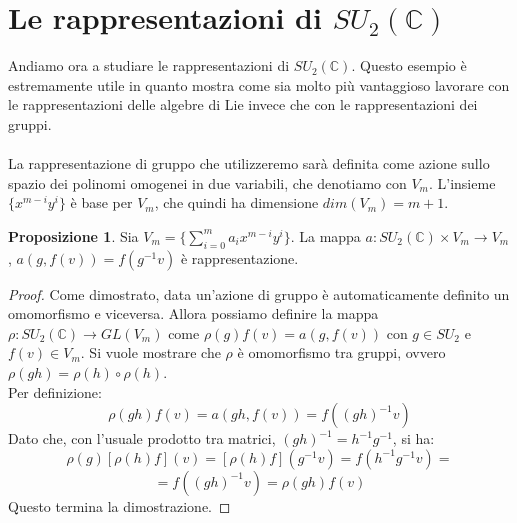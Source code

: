 \documentclass[12pt,a4paper]{report}
\theoremstyle{definition}
\theoremstyle{Theorem}
\newtheorem{Prop}[Def]{Proposizione}
\theoremstyle{definition}
\theoremstyle{definition}
\theoremstyle{definition}
\begin{document}
\section{Le rappresentazioni di $SU_2(\mathbb{C})$}
Andiamo ora a studiare le rappresentazioni di $SU_2(\mathbb{C})$. Questo esempio è estremamente utile in quanto mostra come sia molto più vantaggioso lavorare con le rappresentazioni delle algebre di Lie invece che con le rappresentazioni dei gruppi.\\
\\
La rappresentazione di gruppo che utilizzeremo sarà definita come azione sullo spazio dei polinomi omogenei in due variabili, che denotiamo con $V_m$.
	L'insieme $\{x^{m-i}y^i\}$ è base per $V_m$, che quindi ha dimensione $dim(V_m)=m+1$.
	\begin{comment}
		Sia $f(v)=f(x,y)$ un elemento di $V_m$ e $g$ un elemento di $SU_2(\mathbb{C})$ con inverso $g^{-1}$.\\
	Dunque, se $g\in SU_2(\mathbb{C})$ è nella forma $g=$
	$\begin{pmatrix}
	\alpha&\beta\\
	-\bar{\beta}&\bar{\alpha}
	\end{pmatrix}$,
	allora il suo inverso sarà $g^{-1}=
	\begin{pmatrix}
	\bar{\alpha}&-\beta\\
	\bar{\beta}&\alpha
	\end{pmatrix}$ dato che il determinante di $g$ è 1. \\
	Applicare $g^{-1}$ ad una coppia $(x,y)$ significa computare:
	$g^{-1}v=g^{-1}
	\begin{pmatrix}
	x\\y
	\end{pmatrix}=
	\begin{pmatrix}
	\bar{\alpha}x-\beta y\\
	\bar{\beta}x+\alpha y
	\end{pmatrix}$
	Da ciò $(g,f(x,y))\longmapsto f(\bar{\alpha}x-\beta y,\bar{\beta}x+\alpha y)$
	\end{comment}
\begin{Prop}
	Sia $V_m=\{\sum_{i=0}^{m} a_ix^{m-i}y^i\}$. La mappa $a:SU_2(\mathbb{C})\times V_m\rightarrow V_m$, $a(g,f(v))=f(g^{-1}v)$ è rappresentazione.
\end{Prop}
\begin{proof}
	Come dimostrato, data un'azione di gruppo è automaticamente definito un omomorfismo e viceversa. Allora possiamo definire la mappa $\rho:SU_2(\mathbb{C})\rightarrow GL(V_m)$ come $\rho(g)f(v)=a(g,f(v))$ con $g\in SU_2$ e $f(v)\in V_m$.
	Si vuole mostrare che $\rho$ è omomorfismo tra gruppi, ovvero $\rho(gh)=\rho(h)\circ\rho(h)$.\\
	Per definizione:
	$$\rho(gh)f(v)=a(gh,f(v))=f((gh)^{-1}v)$$
	Dato che, con l'usuale prodotto tra matrici, $(gh)^{-1}=h^{-1}g^{-1}$, si ha:
	$$\rho(g)[\rho(h)f](v)=[\rho(h)f](g^{-1}v)=f(h^{-1}g^{-1}v)=$$
	$$=f((gh)^{-1}v)=\rho(gh)f(v)$$
	Questo termina la dimostrazione.
\end{proof}
\end{document}
